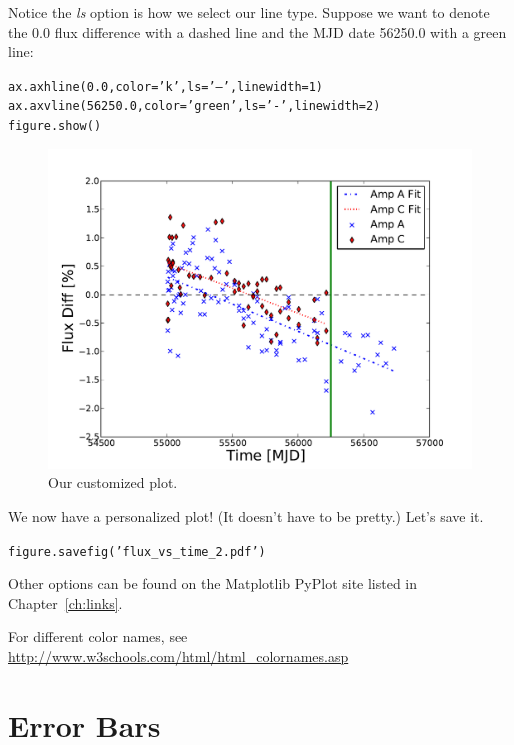 Notice the \textit{ls} option is how we select our line type. 
Suppose we want to denote the 0.0 flux difference with a dashed line and the
MJD date 56250.0 with a green line:

\begin{alltt}
\pytab ax.axhline(0.0, color='k', ls='--', linewidth=1)  
\pytab ax.axvline(56250.0, color='green', ls='-', linewidth=2) 
\pytab figure.show()
\end{alltt}

\begin{figure}[tbp]
  \centering
    \includegraphics[scale=0.55]{flux_vs_time_2.pdf}
    \caption{Our customized plot.}
  \label{fig:flux_vs_time_2}
\end{figure}

We now have a personalized plot! (It doesn't have to be pretty.) Let's save it.

\begin{alltt}
\pytab figure.savefig('flux_vs_time_2.pdf')
\end{alltt}

Other options can be found on the Matplotlib PyPlot site listed in Chapter~\ref{ch:links}. 

For different color names, see \href{http://www.w3schools.com/html/html_colornames.asp}
{http://www.w3schools.com/html/html\_colornames.asp}



\section{Error Bars}

